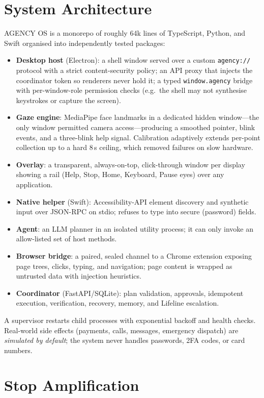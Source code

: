 \documentclass[11pt]{article}
\begin{document}
\section{System Architecture}\label{sec:arch}
\textsc{AGENCY OS} is a monorepo of roughly 64k lines of TypeScript, Python, and Swift organised into independently tested packages:
\begin{itemize}[leftmargin=*,itemsep=1pt]
\item \textbf{Desktop host} (Electron): a shell window served over a custom \texttt{agency://} protocol with a strict content-security policy; an API proxy that injects the coordinator token so renderers never hold it; a typed \texttt{window.agency} bridge with per-window-role permission checks (e.g.\ the shell may not synthesise keystrokes or capture the screen).
\item \textbf{Gaze engine}: MediaPipe face landmarks in a dedicated hidden window---the only window permitted camera access---producing a smoothed pointer, blink events, and a three-blink help signal. Calibration adaptively extends per-point collection up to a hard 8\,s ceiling, which removed failures on slow hardware.
\item \textbf{Overlay}: a transparent, always-on-top, click-through window per display showing a rail (Help, Stop, Home, Keyboard, Pause eyes) over any application.
\item \textbf{Native helper} (Swift): Accessibility-API element discovery and synthetic input over JSON-RPC on stdio; refuses to type into secure (password) fields.
\item \textbf{Agent}: an LLM planner in an isolated utility process; it can only invoke an allow-listed set of host methods.
\item \textbf{Browser bridge}: a paired, sealed channel to a Chrome extension exposing page trees, clicks, typing, and navigation; page content is wrapped as untrusted data with injection heuristics.
\item \textbf{Coordinator} (FastAPI/SQLite): plan validation, approvals, idempotent execution, verification, recovery, memory, and Lifeline escalation.
\end{itemize}
A supervisor restarts child processes with exponential backoff and health checks. Real-world side effects (payments, calls, messages, emergency dispatch) are \emph{simulated by default}; the system never handles passwords, 2FA codes, or card numbers.

\section{Stop Amplification}\label{sec:stop}
\end{document}
